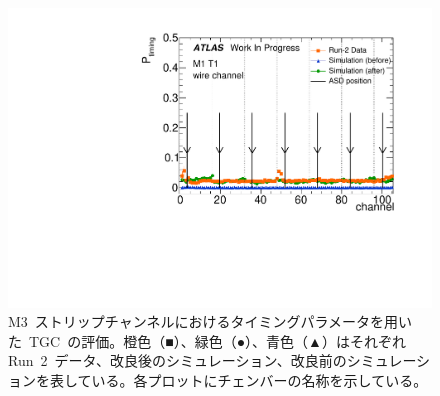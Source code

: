 \begin{figure}[htbp]
\begin{minipage}{0.49\hsize}
			\end{minipage}
			\begin{minipage}{0.49\hsize}
			\centering
			\includegraphics[width=\textwidth,page=35]{img/pdf5/master_timingplot_comp.pdf}
			\end{minipage}
		\caption[M3~ストリップチャンネルにおけるタイミングパラメータを用いた~TGC~の評価。]{M3~ストリップチャンネルにおけるタイミングパラメータを用いた~TGC~の評価。橙色（■）、緑色（●）、青色（▲）はそれぞれRun~2~データ、改良後のシミュレーション、改良前のシミュレーションを表している。各プロットにチェンバーの名称を示している。}
		\label{fig:timingPlotCompStripM3}
	\end{figure}
	
